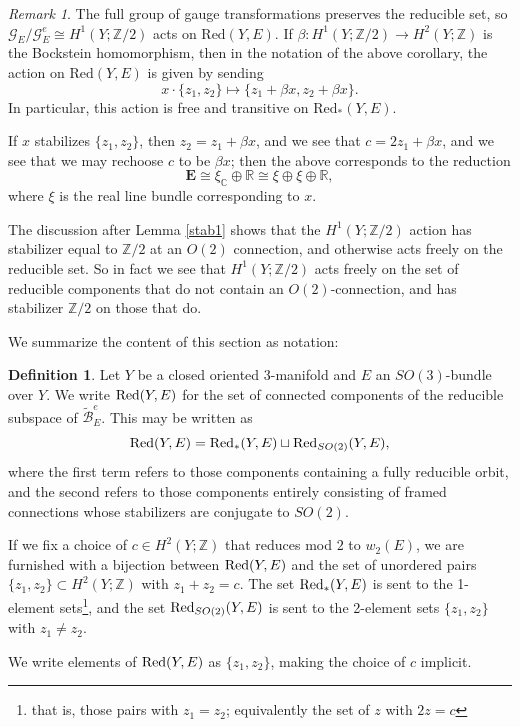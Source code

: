 \documentclass{memo-l}
\theoremstyle{definition}
\newtheorem{definition}[theorem]{Definition}
\theoremstyle{remark}
\newtheorem{remark}[theorem]{Remark}
\numberwithin{section}{chapter}
\numberwithin{equation}{chapter}
\begin{document}
\begin{remark}\label{H1action} The full group of gauge transformations preserves the reducible set, so $\mathcal G_E/\mathcal G^e_E \cong H^1(Y;\mathbb Z/2)$ acts on $\text{Red}(Y,E)$. If $\beta: H^1(Y;\mathbb Z/2) \to H^2(Y;\mathbb Z)$ is the Bockstein homomorphism, then in the notation of the above corollary, the action on $\text{Red}(Y,E)$ is given by sending $$x \cdot \{z_1, z_2\} \mapsto \{z_1 + \beta x, z_2 + \beta x\}.$$ In particular, this action is free and transitive on $\text{Red}_*(Y,E)$. 

If $x$ stabilizes $\{z_1, z_2\}$, then $z_2 = z_1 + \beta x$, and we see that $c = 2z_1 + \beta x$, and we see that we may rechoose $c$ to be $\beta x$; then the above corresponds to the reduction $$\mathbf{E} \cong \xi_{\mathbb C} \oplus \mathbb R \cong \xi \oplus \xi \oplus \mathbb R,$$ where $\xi$ is the real line bundle corresponding to $x$. 

The discussion after Lemma \ref{stab1} shows that the $H^1(Y;\mathbb Z/2)$ action has stabilizer equal to $\mathbb Z/2$ at an $O(2)$ connection, and otherwise acts freely on the reducible set. So in fact we see that $H^1(Y;\mathbb Z/2)$ acts freely on the set of reducible components that do not contain an $O(2)$-connection, and has stabilizer $\mathbb Z/2$ on those that do.
\end{remark}

We summarize the content of this section as notation: 

\begin{definition}\label{red-def}Let $Y$ be a closed oriented 3-manifold and $E$ an $SO(3)$-bundle over $Y$. We write $\textup{Red}(Y,E)$ for the set of connected components of the reducible subspace of $\widetilde{\mathcal B}^e_E$. This may be written as $$\textup{Red}(Y,E) = \textup{Red}_{*}(Y,E) \sqcup \textup{Red}_{SO(2)}(Y, E),$$ where the first term refers to those components containing a fully reducible orbit, and the second refers to those components entirely consisting of framed connections whose stabilizers are conjugate to $SO(2)$. 

If we fix a choice of $c \in H^2(Y;\mathbb Z)$ that reduces mod $2$ to $w_2(E)$, we are furnished with a bijection between $\textup{Red}(Y,E)$ and the set of unordered pairs $\{z_1, z_2\} \subset H^2(Y;\mathbb Z)$ with $z_1 + z_2 = c$. The set $\textup{Red}_*(Y,E)$ is sent to the 1-element sets\footnote{that is, those pairs with $z_1 = z_2$; equivalently the set of $z$ with $2z = c$}, and the set $\textup{Red}_{SO(2)}(Y,E)$ is sent to the 2-element sets $\{z_1, z_2\}$ with $z_1 \neq z_2$.

We write elements of $\textup{Red}(Y,E)$ as $\{z_1, z_2\}$, making the choice of $c$ implicit.
\end{definition}
\end{document}
